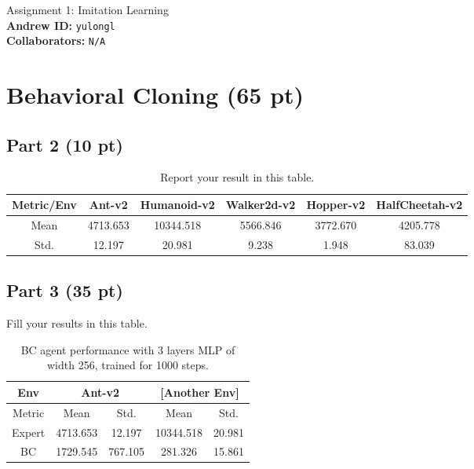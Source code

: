 \documentclass{article}
\begin{document}

\begin{centering}
    {\Large Assignment 1: Imitation Learning} \\
    \vspace{.25cm}
    \textbf{Andrew ID:} \texttt{yulongl} \\
    \textbf{Collaborators:} \texttt{N/A}\\ 
\end{centering}

\vspace{.5cm}

\section{Behavioral Cloning (65 pt)}
\subsection{Part 2 (10 pt)}
\begin{table}[!h]
  \centering
  \caption{Report your result in this table.}
    \begin{tabular}{cccccc}
    \toprule[1.0pt]
    Metric/Env & Ant-v2 & Humanoid-v2 & Walker2d-v2 & Hopper-v2 & HalfCheetah-v2 \\
    \midrule
    Mean  & 4713.653 & 10344.518 & 5566.846 & 3772.670 & 4205.778 \\
    Std.  & 12.197 & 20.981 & 9.238 & 1.948 & 83.039 \\
    \bottomrule[1.0pt]
    \end{tabular}%
  \label{tab:p2}%
\end{table}%

\subsection{Part 3 (35 pt)}
\begin{table}[htbp]
  \centering
  \caption{Fill your results in this table.}
    \begin{tabular}{ccccc}
    \toprule[1.0pt]
    Env   & \multicolumn{2}{c}{Ant-v2} & \multicolumn{2}{c}{[Another Env]} \\
    \midrule
    Metric & Mean  & Std.  & Mean  & Std. \\
    Expert & 4713.653 & 12.197 & 10344.518 & 20.981 \\
    BC    & 1729.545 & 767.105 &  281.326 & 15.861 \\
    \bottomrule[1.0pt]
    \end{tabular}%
  \label{tab:p3}%
  \caption{BC agent performance with 3 layers MLP of width 256, trained for 1000 steps.}
\end{table}%
\end{document}

